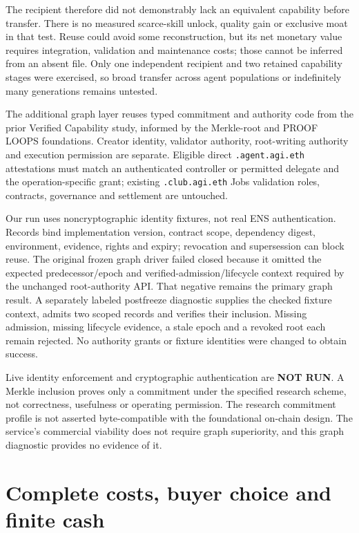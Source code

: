 \documentclass[11pt,letterpaper]{article}
\newcommand{\code}[1]{\texttt{\small #1}}
\newcommand{\status}[1]{\textbf{\color{accent}#1}}
\begin{document}
The recipient therefore did not demonstrably lack an equivalent capability before transfer. There is no measured scarce-skill unlock, quality gain or exclusive moat in that test. Reuse could avoid some reconstruction, but its net monetary value requires integration, validation and maintenance costs; those cannot be inferred from an absent file. Only one independent recipient and two retained capability stages were exercised, so broad transfer across agent populations or indefinitely many generations remains untested.

The additional graph layer reuses typed commitment and authority code from the prior Verified Capability study, informed by the Merkle-root and PROOF LOOPS foundations\cite{merkle,proofloops,verified}. Creator identity, validator authority, root-writing authority and execution permission are separate. Eligible direct \code{*.agent.agi.eth} attestations must match an authenticated controller or permitted delegate and the operation-specific grant; existing \code{*.club.agi.eth} Jobs validation roles, contracts, governance and settlement are untouched.

Our run uses noncryptographic identity fixtures, not real ENS authentication. Records bind implementation version, contract scope, dependency digest, environment, evidence, rights and expiry; revocation and supersession can block reuse. The original frozen graph driver failed closed because it omitted the expected predecessor/epoch and verified-admission/lifecycle context required by the unchanged root-authority API. That negative remains the primary graph result. A separately labeled postfreeze diagnostic supplies the checked fixture context, admits two scoped records and verifies their inclusion. Missing admission, missing lifecycle evidence, a stale epoch and a revoked root each remain rejected. No authority grants or fixture identities were changed to obtain success.

Live identity enforcement and cryptographic authentication are \status{NOT RUN}. A Merkle inclusion proves only a commitment under the specified research scheme, not correctness, usefulness or operating permission. The research commitment profile is not asserted byte-compatible with the foundational on-chain design. The service's commercial viability does not require graph superiority, and this graph diagnostic provides no evidence of it.

\section{Complete costs, buyer choice and finite cash}
\end{document}
